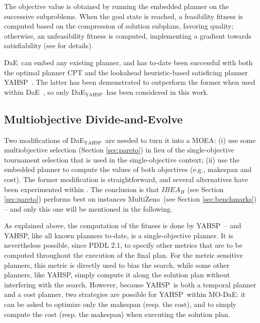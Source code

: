 \documentclass[letterpaper]{article}
\def\DAE{{\sc DaE}}
\newcommand{\DAEYAHSP}{{\sc DaE$_{\text{YAHSP}}$}}
\def\YAHSP{{\sc YAHSP}}
\def\MODAE{{\sc MO-DaE}}
\def\MULTIZENO{{\sc MultiZeno}}
\begin{document}
The objective value is obtained by running the embedded planner on the successive subproblems. When the goal state is reached, a feasibility fitness is computed based on the compression of solution subplans, favoring quality; otherwise, an unfeasibility fitness is computed,  implementing a gradient towards satisfiability (see \cite{Bibai2010} for details).

\DAE\ can embed any existing planner, and has to-date been successful with both the optimal planner CPT \cite{vidal:aaai04} and the lookahead heuristic-based satisficing planner \YAHSP\ \cite{Vidal2004}. The latter has been demonstrated to outperform the former when used within \DAE\ \cite{bibai-EvoCOP2010}, so only \DAEYAHSP\ has been considered in this work.


\subsection{Multiobjective Divide-and-Evolve}
\label{sec:pareto-multi-planning}

Two modifications of \DAEYAHSP\ are needed to turn it into a MOEA: (i) use some multiobjective selection (Section \ref{sec:pareto}) in lieu of the single-objective tournament selection that is used in the single-objective context; (ii) use the embedded planner to compute the values of both objectives (e.g., makespan and cost). The former modification is straightforward, and several alternatives have been experimented within \cite{nous-emo2013}. The conclusion is that $IBEA_H$ \cite{Zitzler2004} (see Section \ref{sec:pareto}) performs best on instances \MULTIZENO\ (see Section \ref{sec:benchmarks}) -- and only this one will be mentioned in the following.

As explained above, the computation of the fitness is done by \YAHSP\ -- and \YAHSP, like all known planners to-date, is a single-objective planner. It is nevertheless possible, since PDDL 2.1, to specify other metrics that are to be computed throughout the execution of the final plan. For the metric sensitive planners, this metric is directly used to bias the search, while some other planners, like \YAHSP, simply compute it along the solution plan without interfering with the search. However, because \YAHSP\ is both a temporal planner and a cost planner, two strategies are possible for \YAHSP\ within \MODAE: it can be asked to optimize only the makespan (resp. the cost), and to simply compute the cost (resp. the makespan) when executing the solution plan. 
\end{document}
